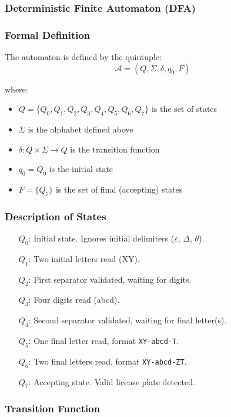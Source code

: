 \documentclass[12pt,a4paper]{article}
\begin{document}
\subsubsection{Deterministic Finite Automaton (DFA)}

\subsubsection{Formal Definition}

The automaton is defined by the quintuple:
\[
\mathcal{A} = (Q, \Sigma, \delta, q_0, F)
\]

where:
\begin{itemize}
    \item $Q = \{Q_0, Q_1, Q_2, Q_3, Q_4, Q_5, Q_6, Q_7\}$ is the set of states
    \item $\Sigma$ is the alphabet defined above
    \item $\delta : Q \times \Sigma \rightarrow Q$ is the transition function
    \item $q_0 = Q_0$ is the initial state
    \item $F = \{Q_7\}$ is the set of final (accepting) states
\end{itemize}

\subsubsection{Description of States}

\begin{itemize}[leftmargin=2cm]
    \item[$Q_0$:] Initial state. Ignores initial delimiters ($\varepsilon$, $\Delta$, $\theta$).
    \item[$Q_1$:] Two initial letters read (XY).
    \item[$Q_2$:] First separator validated, waiting for digits.
    \item[$Q_3$:] Four digits read (abcd).
    \item[$Q_4$:] Second separator validated, waiting for final letter(s).
    \item[$Q_5$:] One final letter read, format \texttt{XY-abcd-T}.
    \item[$Q_6$:] Two final letters read, format \texttt{XY-abcd-ZT}.
    \item[$Q_7$:] Accepting state. Valid license plate detected.
\end{itemize}

\subsubsection{Transition Function}
\end{document}
